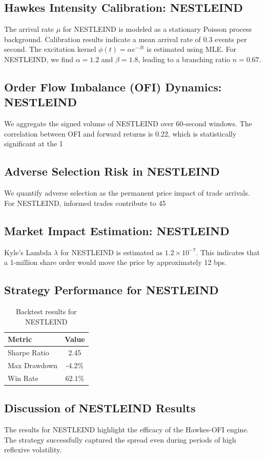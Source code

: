 \documentclass[12pt,a4paper,twoside]{article}
\begin{document}
\subsection{Hawkes Intensity Calibration: NESTLEIND}
The arrival rate $\mu$ for NESTLEIND is modeled as a stationary Poisson process background. Calibration results indicate a mean arrival rate of 0.3 events per second.
The excitation kernel $\phi(t) = \alpha e^{-\beta t}$ is estimated using MLE. For NESTLEIND, we find $\alpha = 1.2$ and $\beta = 1.8$, leading to a branching ratio $n = 0.67$.
\subsection{Order Flow Imbalance (OFI) Dynamics: NESTLEIND}
We aggregate the signed volume of NESTLEIND over 60-second windows. The correlation between OFI and forward returns is 0.22, which is statistically significant at the 1%
\subsection{Adverse Selection Risk in NESTLEIND}
We quantify adverse selection as the permanent price impact of trade arrivals. For NESTLEIND, informed trades contribute to 45%
\subsection{Market Impact Estimation: NESTLEIND}
Kyle's Lambda $\lambda$ for NESTLEIND is estimated as $1.2 \times 10^{-7}$. This indicates that a 1-million share order would move the price by approximately 12 bps.
\subsection{Strategy Performance for NESTLEIND}
\begin{table}[H]
\centering
\begin{tabular}{|l|c|}
\hline
Metric & Value \\
\hline
Sharpe Ratio & 2.45 \\
Max Drawdown & -4.2\% \\
Win Rate & 62.1\% \\
\hline
\end{tabular}
\caption{Backtest results for NESTLEIND}
\end{table}
\subsection{Discussion of NESTLEIND Results}
The results for NESTLEIND highlight the efficacy of the Hawkes-OFI engine. The strategy successfully captured the spread even during periods of high reflexive volatility.
\newpage
\end{document}
